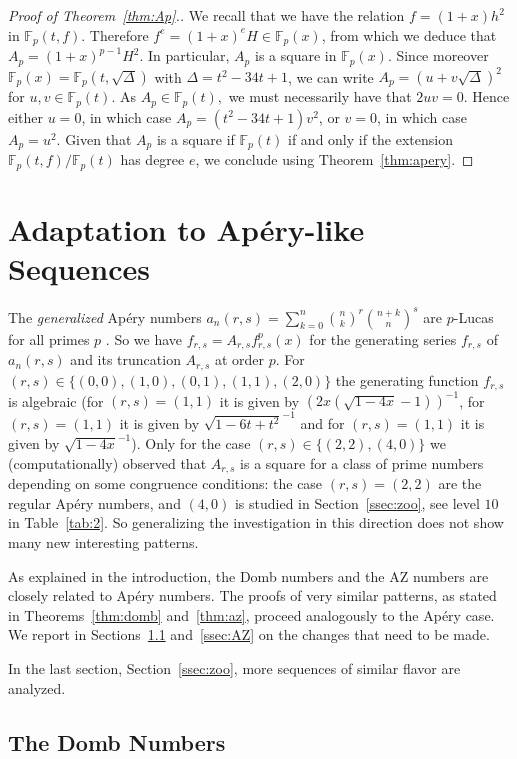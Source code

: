 \documentclass{article}
\newcommand{\F}{\mathbb{F}}
\theoremstyle{definition}
\theoremstyle{plain}
\theoremstyle{remark}
\begin{document}
\begin{proof}[Proof of Theorem~\ref{thm:Ap}.]
We recall that we have the relation $f = (1+x) h^2$ in $\F_p(t,f)$.
Therefore $f^e = (1+x)^e H \in \F_p(x)$, from which we deduce that $A_p = (1+x)^{p-1} H^2$. In particular, $A_p$ is a square in $\F_p(x)$.
Since moreover $\F_p(x)=\F_p(t, \sqrt{\Delta})$ with $\Delta = t^2-34t+1$, we can write $A_p=(u+v\sqrt{\Delta})^2$ for $u, v\in \F_p(t)$.
As $A_p\in \F_p(t),$ we must necessarily have that $2uv=0$.
Hence either $u = 0$, in which case $A_p = (t^2-34t+1) v^2$, or $v = 0$, in which case $A_p = u^2$.
Given that $A_p$ is a square if $\F_p(t)$ if and only if the extension $\F_p(t,f)/\F_p(t)$ has degree $e$, we conclude using Theorem~\ref{thm:apery}.
\end{proof}


\section{Adaptation to Apéry-like Sequences}

The \emph{generalized} Apéry numbers $a_n(r,s)=\sum_{k=0}^n \binom{n}{k}^r \binom{n+k}{n}^s$ are $p$-Lucas for all primes $p$ \cite{DS06}. So we have $f_{r,s}=A_{r,s} f_{r,s}^p(x)$ for the generating series $f_{r,s}$ of $a_n(r,s)$ and its truncation $A_{r,s}$ at order $p$. For $(r,s)\in \{(0,0), (1, 0), (0,1), (1,1), (2,0)\}$ the generating function $f_{r,s}$ is algebraic (for $(r,s)=(1,1)$ it is given by $(2x(\sqrt{1-4x}-1))^{-1}$,  for $(r,s)=(1,1)$ it is given by $\sqrt{1 - 6t + t^2}^{-1}$ and for $(r,s)=(1,1)$ it is given by $\sqrt{1-4x}^{-1}$). Only for the case $(r,s)\in\{(2,2), (4,0)\}$ we (computationally) observed that $A_{r,s}$ is a square for a class of prime numbers depending on some congruence conditions: the case $(r,s)=(2,2)$ are the regular Apéry numbers, and $(4,0)$ is studied in Section~\ref{ssec:zoo}, see level $10$ in Table~\ref{tab:2}. So generalizing the investigation in this direction does not show many new interesting patterns.

As explained in the introduction, the Domb numbers and the AZ numbers are closely related to Apéry numbers. The proofs of very similar patterns, as stated in Theorems~\ref{thm:domb} and~\ref{thm:az}, proceed analogously to the Apéry case.
We report in Sections~\ref{ssec:domb} and~\ref{ssec:AZ} on the changes that need to be made. 

In the last section, Section~\ref{ssec:zoo}, more sequences of similar flavor are analyzed.

\subsection{The Domb Numbers}
\label{ssec:domb}
\end{document}
